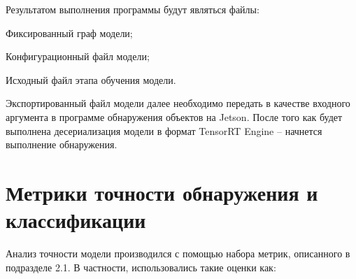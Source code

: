 
Результатом выполнения программы будут являться файлы:

%
\begin{itemize*}
  \item Фиксированный граф модели;
  \item Конфигурационный файл модели;
  \item Исходный файл этапа обучения модели.
\end{itemize*}
%

Экспортированный файл модели далее необходимо передать в качестве входного аргумента в программе обнаружения объектов на Jetson. После того как будет выполнена десериализация модели в формат TensorRT Engine – начнется выполнение обнаружения. 

\section{Метрики точности обнаружения и классификации}

Анализ точности модели производился с помощью набора метрик, описанного в подразделе 2.1. В частности, использовались такие оценки как:


